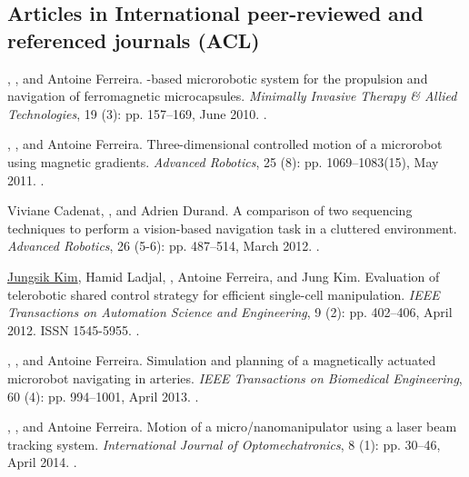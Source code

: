 \subsection[Articles  in International Journals]{Articles in International peer-reviewed and referenced journals (ACL)}
\begin{Mybibliography}{99}
  \KBelharet, \DavidFolio, and Antoine Ferreira.
  \newblock {\MRIshort}-based microrobotic system for the propulsion and navigation of
  ferromagnetic microcapsules.
  \newblock \emph{Minimally Invasive Therapy \& Allied Technologies}, 19
  (3): pp. 157--169, June 2010{}.
  \newblock {}.
  
  \KBelharet, \DavidFolio, and Antoine Ferreira.
  \newblock Three-dimensional controlled motion of a microrobot using magnetic
  gradients.
  \newblock \emph{Advanced Robotics}, 25 (8): pp. 1069--1083(15),
  May 2011.
  \newblock {}.
  
 
 Viviane Cadenat, \DavidFolio, and Adrien Durand.
 \newblock A comparison of two sequencing techniques to perform a vision-based
 navigation task in a cluttered environment.
 \newblock \emph{Advanced Robotics}, 26 (5-6): pp. 487--514, March
 2012.
 \newblock {}.
  
  \uline{Jungsik Kim}, Hamid Ladjal, \DavidFolio, Antoine Ferreira, and Jung Kim.
  \newblock Evaluation of telerobotic shared control strategy for efficient
  single-cell manipulation.
  \newblock \emph{{IEEE} Transactions on Automation Science and Engineering},
  9 (2): pp. 402--406, April 2012.
  \newblock ISSN 1545-5955.
  \newblock {}.

  
  \KBelharet, \DavidFolio, and Antoine Ferreira.
  \newblock Simulation and planning of a magnetically actuated microrobot
  navigating in arteries.
  \newblock \emph{{IEEE} Transactions on Biomedical Engineering}, 60
  (4): pp. 994--1001, April 2013{}.
  \newblock {}.
  
  \NAmari, \DavidFolio, and Antoine Ferreira.
  \newblock Motion of a micro/nanomanipulator using a laser beam tracking system.
  \newblock \emph{International Journal of Optomechatronics}, 8
  (1): pp. 30--46, April 2014{}.
  \newblock {}.
    

\end{Mybibliography}
